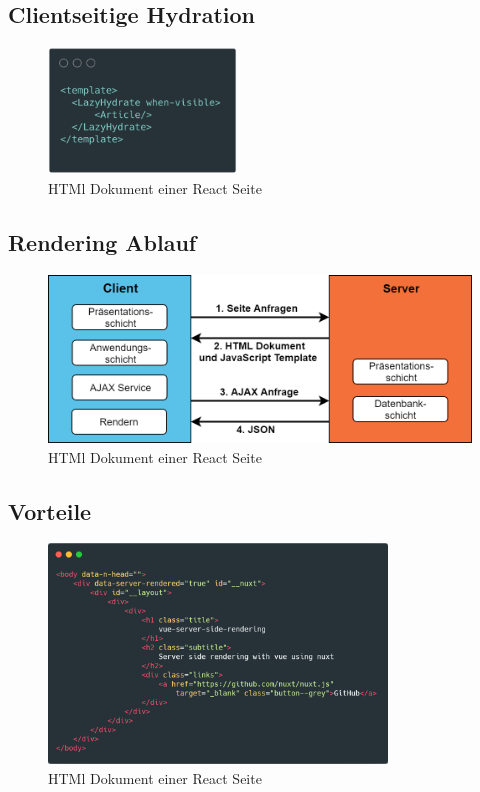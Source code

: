 \documentclass[runningheads]{llncs}
\begin{document}
\subsection{Clientseitige Hydration}
\label{subsec:Clientseitige Hydration}

\begin{figure}[h]
  \centering
  \includegraphics[width=5cm]{images/LazyHydration}
  \caption{HTMl Dokument einer React Seite}
\end{figure}

\subsection{Rendering Ablauf}
\label{subsec:Rendering Ablauf}

\begin{figure}[h]
  \centering
  \includegraphics[width=12cm]{images/universal}
  \caption{HTMl Dokument einer React Seite}
\end{figure}

\newpage
\subsection{Vorteile}
\label{subsec:Vorteile}

\begin{figure}[h]
  \centering
  \includegraphics[width=9cm]{images/nuxt-body-first}
  \caption{HTMl Dokument einer React Seite}
\end{figure}
\end{document}
